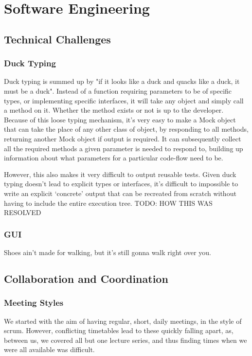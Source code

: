 \chapter{Software Engineering}
\section{Technical Challenges}
  \subsection{Duck Typing}
    Duck typing is summed up by "if it looks like a duck and quacks like a duck, it must be a duck".
    Instead of a function requiring parameters to be of specific types, or implementing specific interfaces, it will take any object and simply call a method on it.
    Whether the method exists or not is up to the developer.
    Because of this loose typing mechanism, it's very easy to make a Mock object that can take the place of any other class of object, by responding to all methods, returning another Mock object if output is required.
    It can subsequently collect all the required methods a given parameter is needed to respond to, building up information about what parameters for a particular code-flow need to be.

    However, this also makes it very difficult to output reusable tests.
    Given duck typing doesn't lead to explicit types or interfaces, it's difficult to impossible to write an explicit `concrete' output that can be recreated from scratch without having to include the entire execution tree.
    TODO: HOW THIS WAS RESOLVED

  \subsection{GUI}
    Shoes ain't made for walking, but it's still gonna walk right over you.

\section{Collaboration and Coordination}

  \subsection{Meeting Styles}
    We started with the aim of having regular, short, daily meetings, in the style of scrum.
    However, conflicting timetables lead to these quickly falling apart, as, between us, we covered all but one lecture series, and thus finding times when we were all available was difficult.

